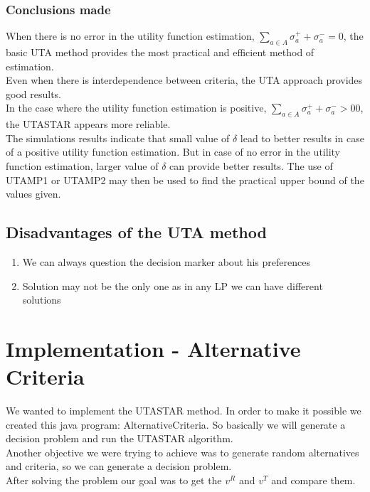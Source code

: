 \documentclass{report}
\begin{document}
\subsubsection{Conclusions made}
When there is no error in the utility function estimation, $ \sum_{a \in A} \sigma _{a}^{+} + \sigma _{a}^{-} = 0$, the basic UTA method provides the most practical and efficient method of estimation. \\
Even when there is interdependence between criteria, the UTA approach provides good results. \\
In the case where the utility function estimation is positive, $ \sum_{a \in A} \sigma _{a}^{+} + \sigma _{a}^{-} >0 0$, the UTASTAR appears more reliable.\\
The simulations results indicate that small value of $\delta$  lead to better results in case of a positive utility function estimation. But in case of no error in the utility function estimation, larger value of $\delta$ can provide better results. The use of UTAMP1 or UTAMP2 may then be used to find the practical upper bound of the values given.  

\subsection{Disadvantages of the UTA method}
\begin{enumerate}
\item We can always question the decision marker about his preferences
\item Solution may not be the only one as in any LP we can have different solutions
\end{enumerate}

\section{Implementation - Alternative Criteria}
We wanted to implement the UTASTAR method. In order to make it possible we created this java program: AlternativeCriteria. So basically we will generate a decision problem and run the UTASTAR algorithm. \\
Another objective we were trying to achieve was to generate random alternatives and criteria, so we can generate a decision problem. \\
After solving the problem our goal was to get the $v^{R}$ and $v^{T}$ and compare them. 
\end{document}
